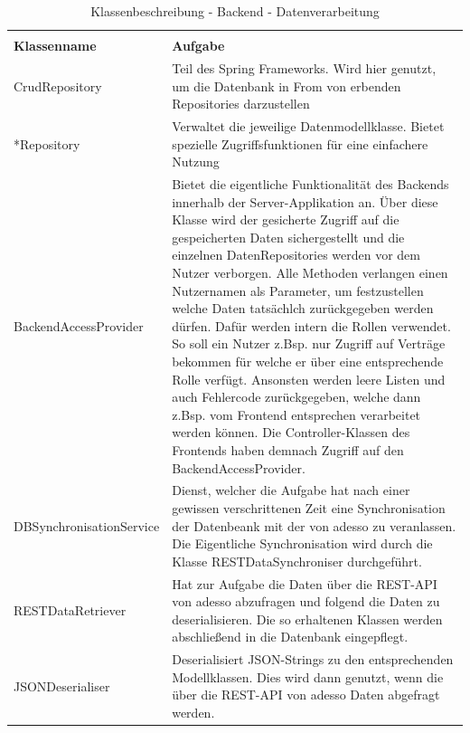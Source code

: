 \centering
\begin{longtable}[h]{p{5cm} p{9cm}}
	\caption{Klassenbeschreibung - Backend - Datenverarbeitung}
	\label{table:klassenbeschreibung-backend-data}
	\endlastfoot
	\multicolumn{2}{r}{{Weitergeführt auf der folgenden Seite}} \\
	\endfoot
	\endhead
	\rowcolor[HTML]{C0C0C0} 
	\textbf{Klassenname} & \textbf{Aufgabe} \\
	CrudRepository & Teil des Spring Frameworks. Wird hier genutzt, um die Datenbank in From von erbenden Repositories darzustellen \\
	\rowcolor[HTML]{E7E7E7} 
	*Repository & Verwaltet die jeweilige Datenmodellklasse. Bietet spezielle Zugriffsfunktionen für eine einfachere Nutzung \\
	BackendAccessProvider & Bietet die eigentliche Funktionalität des Backends innerhalb der Server-Applikation an. Über diese Klasse wird der gesicherte Zugriff auf die gespeicherten Daten sichergestellt und die 
    einzelnen DatenRepositories werden vor dem Nutzer verborgen. Alle Methoden verlangen einen Nutzernamen als Parameter, um festzustellen welche Daten tatsächlch zurückgegeben werden dürfen. Dafür werden intern die Rollen verwendet.
    So soll ein Nutzer z.Bsp. nur Zugriff auf Verträge bekommen für welche er über eine entsprechende Rolle verfügt. Ansonsten werden leere Listen und auch Fehlercode zurückgegeben, welche dann z.Bsp. vom Frontend
    entsprechen verarbeitet werden können. Die Controller-Klassen des Frontends haben demnach Zugriff auf den BackendAccessProvider. \\
	\rowcolor[HTML]{E7E7E7} 
	DBSynchronisationService & Dienst, welcher die Aufgabe hat nach einer gewissen verschrittenen Zeit eine Synchronisation der Datenbeank mit der von adesso zu veranlassen. Die Eigentliche Synchronisation wird
    durch die Klasse RESTDataSynchroniser durchgeführt. \\
    RESTDataRetriever & Hat zur Aufgabe die Daten über die REST-API von adesso abzufragen und folgend die Daten zu deserialisieren. Die so erhaltenen Klassen werden abschließend in die Datenbank eingepflegt. \\
	\rowcolor[HTML]{E7E7E7} 
    JSONDeserialiser & Deserialisiert JSON-Strings zu den entsprechenden Modellklassen. Dies wird dann genutzt, wenn die über die REST-API von adesso Daten abgefragt werden. \\
\end{longtable}